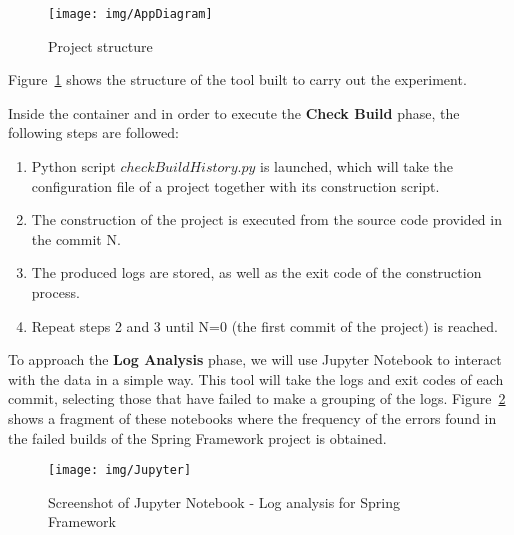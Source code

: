 \begin{figure}[h!]
	\begin{center}
		\texttt{[image: img/AppDiagram]}
		\caption{Project structure}
		\label{fig:app}
	\end{center}
\end{figure}

Figure~\ref{fig:app} shows the structure of the tool built to carry out the experiment.

Inside the container and in order to execute the \textbf{Check Build} phase, the following steps are followed:
\begin{enumerate}
	\item Python script $checkBuildHistory.py$ is launched, which will take the configuration file of a project together with its construction script.
	\item The construction of the project is executed from the source code provided in the commit N.
	\item The produced logs are stored, as well as the exit code of the construction process.
	\item Repeat steps 2 and 3 until N=0 (the first commit of the project) is reached.
\end{enumerate}

To approach the \textbf{Log Analysis} phase, we will use Jupyter Notebook to interact with the data in a simple way. This tool will take the logs and exit codes of each commit, selecting those that have failed to make a grouping of the logs. Figure~\ref{fig:jupyter} shows a fragment of these notebooks where the frequency of the errors found in the failed builds of the Spring Framework project is obtained. 

\begin{figure}[h!]
	\begin{center}
		\texttt{[image: img/Jupyter]}
		\caption{Screenshot of Jupyter Notebook - Log analysis for Spring Framework}
		\label{fig:jupyter}
	\end{center}
\end{figure}


